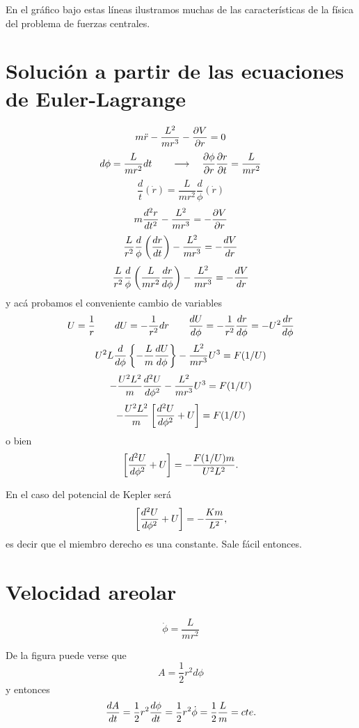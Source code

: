 \documentclass[10pt,oneside]{CBFT_article}
\begin{document}
En el gráfico bajo estas líneas ilustramos muchas de las características de la física del problema
de fuerzas centrales.

\section{Solución a partir de las ecuaciones de Euler-Lagrange}

\[
	m \ddot{r} -\frac{L^2}{m r^3} -\dpar{V}{r}= 0 
\]
\[
	d \phi = \frac{L}{m r^2} dt \qquad \longrightarrow \quad  \dpar{\phi}{r}\dpar{r}{t}  = \frac{L}{m r^2}
\]
\[
	\frac{d}{t}(\dot{r}) = \frac{L}{m r^2} \frac{d}{\phi}(\dot{r})
\]
\[
	m \dtot[2]{r}{t} -\frac{L^2}{m r^3} = -\dpar{V}{r}
\]
\[
	\frac{L}{r^2} \frac{d}{\phi}\left( \dtot{r}{t} \right) -\frac{L^2}{m r^3} = -\dtot{V}{r}
\]
\[
	\frac{L}{r^2} \frac{d}{\phi}\left( \frac{L}{m r^2}\dtot{r}{\phi} \right) -\frac{L^2}{m r^3} = -\dtot{V}{r}
\]
y acá probamos el conveniente cambio de variables
\[
	U = \frac{1}{r} \qquad dU = -\frac{1}{r^2} dr 
	\qquad \dtot{U}{\phi} = -\frac{1}{r^2}\dtot{r}{\phi} = -U^2\dtot{r}{\phi}
\]
\[
	U^2 L \frac{d}{d\phi} \left\{ -\frac{L}{m}\dtot{U}{\phi} \right\} - \frac{L^2}{m r^3} U^3 = F(1/U)
\]
\[
	- \frac{U^2 L^2}{m} \dtot[2]{U}{\phi} - \frac{L^2}{m r^3} U^3 = F(1/U)
\]
\[
	- \frac{U^2 L^2}{m} \left[ \dtot[2]{U}{\phi} + U \right] = F(1/U)
\]
o bien 
\[
	\left[ \dtot[2]{U}{\phi} + U \right] = - \frac{F(1/U) m}{U^2 L^2}. 
\]

En el caso del potencial de Kepler será 
\[
	\left[ \dtot[2]{U}{\phi} + U \right] = - \frac{K m}{L^2},
\]
es decir que el miembro derecho es una constante. Sale fácil entonces.

\section{Velocidad areolar}

\[
	\dot{\phi} = \frac{L}{m r^2}
\]

De la figura puede verse que 
\[
	A = \frac{1}{2} r^2 d\phi 
\]
y  entonces
\[
	\dtot{A}{t} = \frac{1}{2} r^2 \dtot{\phi}{t} = \frac{1}{2} r^2 \dot{\phi} = \frac{1}{2}\frac{L}{m} = cte.
\]
\end{document}

